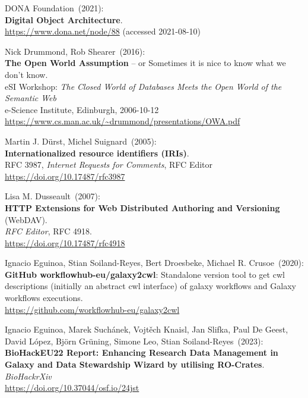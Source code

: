 \begin{thebibliography}{9}
DONA Foundation~(2021): \\
\textbf{Digital Object Architecture}.\\
\url{https://www.dona.net/node/88} (accessed 2021-08-10)

Nick Drummond, Rob Shearer~(2016): \\
\textbf{The Open World Assumption} -- or Sometimes it is nice to know what we don't know.\\
eSI Workshop: \emph{The Closed World of Databases Meets the Open World of the Semantic Web}\\
e-Science Institute, Edinburgh, 2006-10-12\\
\url{https://www.cs.man.ac.uk/~drummond/presentations/OWA.pdf}

Martin J. Dürst, Michel Suignard~(2005): \\
\textbf{Internationalized resource identifiers (IRIs)}.\\
RFC 3987, \emph{Internet Requests for Comments}, RFC Editor\\
\url{https://doi.org/10.17487/rfc3987}

Lisa M. Dusseault~(2007): \\
\textbf{HTTP Extensions for Web Distributed Authoring and Versioning} (WebDAV). \\
\emph{RFC Editor}, RFC 4918.\\
\url{https://doi.org/10.17487/rfc4918}

Ignacio Eguinoa, Stian Soiland-Reyes, Bert Droesbeke, Michael
R. Crusoe~(2020): \\
\textbf{GitHub workflowhub-eu/galaxy2cwl}: Standalone version tool to
get cwl descriptions (initially an abstract cwl interface) of galaxy
workflows and Galaxy workflows executions.\\
\url{https://github.com/workflowhub-eu/galaxy2cwl}

Ignacio Eguinoa, Marek Suchánek, Vojtěch Knaisl, Jan Slifka, Paul De Geest, David López, Björn Grüning, Simone Leo, Stian Soiland-Reyes~(2023): \\
\textbf{BioHackEU22 Report: Enhancing Research Data Management in Galaxy and Data Stewardship Wizard by utilising RO-Crates}.\\
\emph{BioHackrXiv}\\
\url{https://doi.org/10.37044/osf.io/24jst}


\end{thebibliography}
